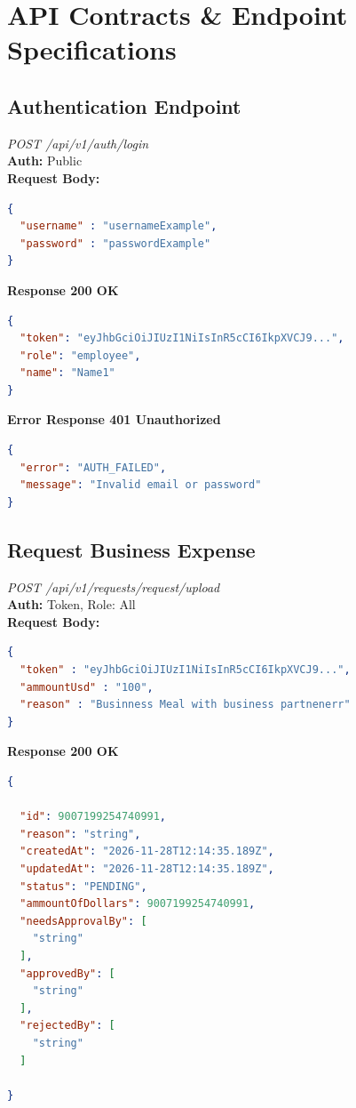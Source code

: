 \documentclass[11pt,a4paper]{article}
\begin{document}
\section{API Contracts \& Endpoint Specifications}

\subsection{Authentication Endpoint}

\emph{POST /api/v1/auth/login} \\
\textbf{Auth:} Public \\
\textbf{Request Body:} \\
\begin{lstlisting}[language=json]
{
  "username" : "usernameExample",
  "password" : "passwordExample"
}
\end{lstlisting}
\textbf{Response 200 OK}

\begin{lstlisting}[language=json]
{
  "token": "eyJhbGciOiJIUzI1NiIsInR5cCI6IkpXVCJ9...",
  "role": "employee",
  "name": "Name1"
}
\end{lstlisting}
\textbf{Error Response 401 Unauthorized}
\begin{lstlisting}[language=json]
{
  "error": "AUTH_FAILED", 
  "message": "Invalid email or password"
}
\end{lstlisting}

\subsection{Request Business Expense}

\emph{POST /api/v1/requests/request/upload} \\
\textbf{Auth:} Token, Role: All \\
\textbf{Request Body:} \\
\begin{lstlisting}[language=json]
{
  "token" : "eyJhbGciOiJIUzI1NiIsInR5cCI6IkpXVCJ9...",
  "ammountUsd" : "100",
  "reason" : "Businness Meal with business partnenerr"
}
\end{lstlisting}
\textbf{Response 200 OK}

\begin{lstlisting}[language=json]
{

  "id": 9007199254740991,
  "reason": "string",
  "createdAt": "2026-11-28T12:14:35.189Z",
  "updatedAt": "2026-11-28T12:14:35.189Z",
  "status": "PENDING",
  "ammountOfDollars": 9007199254740991,
  "needsApprovalBy": [
    "string"
  ],
  "approvedBy": [
    "string"
  ],
  "rejectedBy": [
    "string"
  ]

}
\end{lstlisting}
\end{document}
